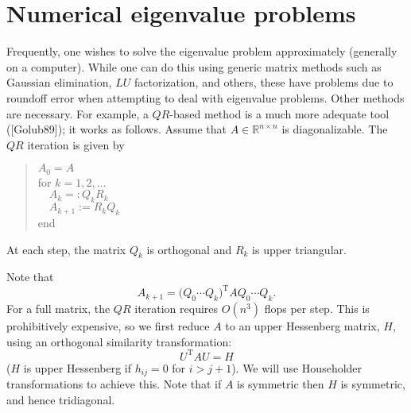 \documentclass[12pt]{article}
\begin{document}
\section*{Numerical eigenvalue problems}
Frequently, one wishes to solve the eigenvalue problem approximately (generally on a computer).  While one can do this using generic matrix methods such as Gaussian elimination, $LU$ factorization, and others, these have problems due to roundoff error when attempting to deal with eigenvalue problems.  Other methods are necessary.  For example, a $QR$-based method is a much more adequate tool ([Golub89]); it works as follows.
Assume that $A\in\mathbb R^{n\times n}$ is diagonalizable. The $QR$ iteration is given by
\begin{quote}
$A_0 = A$\\
for $k = 1,2,\ldots$\\
$\quad A_k =: Q_kR_k$\\
$\quad A_{k+1} := R_kQ_k$\\
end
\end{quote}
At each step, the matrix $Q_k$ is orthogonal and $R_k$ is upper triangular.

Note that 
\[
 A_{k+1} = \big(Q_0\cdots Q_k)^{\mathrm T}AQ_0\cdots Q_k.
\]
For a full matrix, the $QR$ iteration requires $O(n^3)$ flops per step. This is prohibitively expensive, so we first reduce $A$ to an upper Hessenberg matrix, $H$, using an orthogonal similarity transformation:
\[ 
 U^{\mathrm T}AU = H
\]
($H$ is upper Hessenberg if $h_{ij} = 0$ for $i>j+1$). We will use Householder transformations to achieve this. Note that if $A$ is symmetric then $H$ is symmetric, and hence tridiagonal. 
\end{document}

